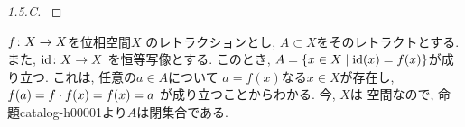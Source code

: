 \documentclass[uplatex, dvipdfmx, a4paper, 12pt, class=jsarticle, crop=false]{standalone}
\begin{document}
\begin{proof}[1.5.C]\label{eng-1-5-C-proof}

\end{proof}
	\( f\colon X\to X \)を位相空間\( X \)
	のレトラクションとし,
	\( A \subset X \)をそのレトラクトとする.
	また, \( \mathrm{id}\colon X\to X \)
	を恒等写像とする.
	このとき, \( A = \setcomp{x \in X}
	{\mathrm{id}(x) = f(x)} \)が成り立つ.
	これは, 任意の\( a \in A \)について
	\( a = f(x) \)なる\( x \in X \)が存在し,
	\( f(a) = f \cdot f(x) = f(x) = a\)
	が成り立つことからわかる.
	今, \( X \)は \Hausdorff 空間なので,
	命題catalog-h00001より\( A \)は閉集合である.
\end{document}

